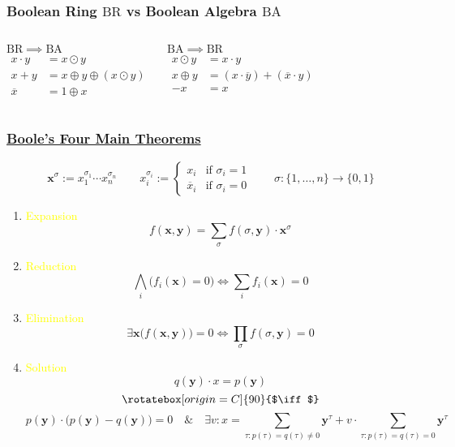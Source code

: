 \documentclass[UTF8,aspectratio=43,11pt,colorlinks,compress,openany]{beamer}%
\begin{document}
\begin{frame}\frametitle{Boolean Ring $\mathrm{BR}$ vs Boolean Algebra $\mathrm{BA}$}
	\begin{columns}
			\begin{block}{$\mathrm{BR} \implies \mathrm{BA}$}
			\setlength\abovedisplayskip{0pt}
				\begin{align*}
				x\cdot y&=x\odot y\\
				x+y&=x\oplus y\oplus(x\odot y)\\
				\overline{x}&=1\oplus x
				\end{align*}
			\end{block}
			\begin{block}{$\mathrm{BA} \implies \mathrm{BR}$}
			\setlength\abovedisplayskip{0pt}
				\begin{align*}
				x\odot y&=x\cdot y\\
				x\oplus y&=(x\cdot\overline{y})+(\overline{x}\cdot y)\\
				-x&=x
				\end{align*}
			\end{block}
	\end{columns}
\end{frame}

\begin{frame}\frametitle{\href{https://www.math.uwaterloo.ca/~snburris/htdocs/Theme2_talk_snburris.pdf}{Boole's Four Main Theorems}}
\setlength\abovedisplayskip{0pt}
\setlength\belowdisplayskip{0pt}\vspace{-1em}
	\[\mathbf{x}^\sigma:=x_1^{\sigma_1}\cdots x_n^{\sigma_n}\qquad x_i^{\sigma_i}:=
	\begin{cases}
	x_i &\mbox{if } \sigma_i=1\\
	\overline{x}_i &\mbox{if } \sigma_i=0
	\end{cases}\qquad\sigma:\{1,\dots,n\}\to\{0,1\}\]
	\begin{enumerate}
		\item \textcolor{yellow}{Expansion}\vspace{-1em}
		\[f(\mathbf{x},\mathbf{y})=\sum_\sigma f(\sigma,\mathbf{y})\cdot \mathbf{x}^\sigma\]
		\item \textcolor{yellow}{Reduction}\vspace{-1em}
		\[\bigwedge_i\big(f_i(\mathbf{x})=0\big)\iff\sum_i f_i(\mathbf{x})=0\]
		\item \textcolor{yellow}{Elimination}\vspace{-1em}
		\[\exists \mathbf{x}\big(f(\mathbf{x},\mathbf{y})\big)=0\iff \prod_\sigma f(\sigma,\mathbf{y})=0\]
		\item \textcolor{yellow}{Solution}\vspace{-1em}
		\[q(\mathbf{y})\cdot x=p(\mathbf{y})\]
		\[\rotatebox[origin=C]{90}{$\iff$}\]
		\[p(\mathbf{y})\cdot\big(p(\mathbf{y})-q(\mathbf{y})\big)=0\quad\&\quad \exists v: x=\!\!\!\sum\limits_{\tau: p(\tau)=q(\tau)\neq 0}\!\!\!\!\!\mathbf{y}^\tau+v\cdot \!\!\!\!\!\sum\limits_{\tau: p(\tau)=q(\tau)=0}\!\!\!\!\!\mathbf{y}^\tau\]
	\end{enumerate}
\end{frame}
\end{document}

